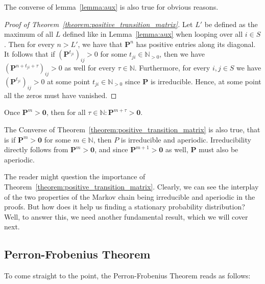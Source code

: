 \documentclass[../../main.tex]{subfiles}
\begin{document}
\begin{remark}
    \label{remark:converse_lemma_aux}
    The converse of lemma~\ref{lemma:aux} is also true for obvious reasons.
\end{remark}

\begin{proof}[Proof of Theorem~\ref{theorem:positive_transition_matrix}]
    Let $L'$ be defined as the maximum of all $L$ defined like in Lemma~\ref{lemma:aux} when looping over all $i \in S$. Then for every $n > L'$, we have that $\bm{P}^n$ has positive entries along its diagonal. It follows that if $(\bm{P}^{t_{ji}})_{ij} > 0$ for some $t_{ji} \in \mathbb{N}_{>0}$, then we have $(\bm{P}^{n + t_{ji} + \tau})_{ij} > 0$ as well for every $\tau \in \mathbb{N}$. Furthermore, for every $i,j \in S$ we have $(\bm{P}^{t_{ji}})_{ij} > 0$ at some point $t_{ji} \in \mathbb{N}_{>0}$ since $\bm{P}$ is irreducible. Hence, at some point all the zeros must have vanished.
\end{proof}

\begin{corollary}
    Once $\bm{P}^m > \bm{0}$, then for all $\tau \in \mathbb{N}: \bm{P}^{m + \tau} > \bm{0}$. 
\end{corollary}

\begin{corollary}
    \label{corollary:converse_positive_transition_matrix}
    The Converse of Theorem~\ref{theorem:positive_transition_matrix} is also true, that is if $\bm{P}^m > \bm{0}$ for some $m \in \mathbb{N}$, then $P$ is irreducible and aperiodic. Irreducibility directly follows from $\bm{P}^m > \bm{0}$, and since $\bm{P}^{m + 1} > \bm{0}$ as well, $\bm{P}$ must also be aperiodic.
\end{corollary}

The reader might question the importance of Theorem~\ref{theorem:positive_transition_matrix}. Clearly, we can see the interplay of the two properties of the Markov chain being irreducible and aperiodic in the proofs. But how does it help us finding a stationary probability distribution? Well, to answer this, we need another fundamental result, which we will cover next.


\subsection{Perron-Frobenius Theorem}
To come straight to the point, the Perron-Frobenius Theorem reads as follows:
\end{document}
